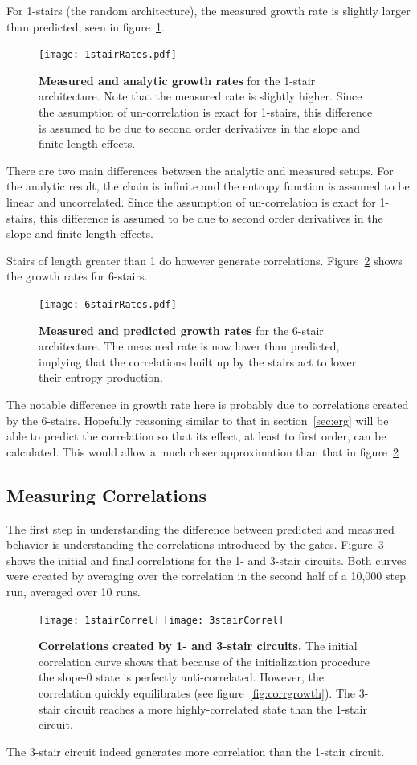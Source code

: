 \documentclass[11pt]{article}
\begin{document}
For 1-stairs (the random architecture), the measured growth rate is slightly larger than predicted, seen in figure~\ref{fig:1stairRates}.
\begin{figure}
	\centering
	\texttt{[image: 1stairRates.pdf]}
	\caption{\textbf{Measured and analytic growth rates} for the 1-stair architecture. Note that the measured rate is slightly higher. Since the assumption of un-correlation is exact for 1-stairs, this difference is assumed to be due to second order derivatives in the slope and finite length effects.}
	\label{fig:1stairRates}
\end{figure}
There are two main differences between the analytic and measured setups. For the analytic result, the chain is infinite and the entropy function is assumed to be linear and uncorrelated. Since the assumption of un-correlation is exact for 1-stairs, this difference is assumed to be due to second order derivatives in the slope and finite length effects.

Stairs of length greater than 1 do however generate correlations. Figure~\ref{fig:6stairRates} shows the growth rates for 6-stairs. 
\begin{figure}
	\centering
	\texttt{[image: 6stairRates.pdf]}
	\caption{\textbf{Measured and predicted growth rates} for the 6-stair architecture. The measured rate is now lower than predicted, implying that the correlations built up by the stairs act to lower their entropy production.}
	\label{fig:6stairRates}
\end{figure}
The notable difference in growth rate here is probably due to correlations created by the 6-stairs. Hopefully reasoning similar to that in section~\ref{sec:erg} will be able to predict the correlation so that its effect, at least to first order, can be calculated. This would allow a much closer approximation than that in figure~\ref{fig:6stairRates}

\subsection{Measuring Correlations} \emph{} \label{sub:correlations}

The first step in understanding the difference between predicted and measured behavior is understanding the correlations introduced by the gates. Figure~\ref{fig:stairCorrel} shows the initial and final correlations for the 1- and 3-stair circuits. Both curves were created by averaging over the correlation in the second half of a 10,000 step run, averaged over 10 runs.
\begin{figure}
	\centering
	\texttt{[image: 1stairCorrel]}
	\texttt{[image: 3stairCorrel]}
	\caption{\textbf{Correlations created by 1- and 3-stair circuits.} The initial correlation curve shows that because of the initialization procedure the slope-0 state is perfectly anti-correlated. However, the correlation quickly equilibrates (see figure~\ref{fig:corrgrowth}). The 3-stair circuit reaches a more highly-correlated state than the 1-stair circuit.}
	\label{fig:stairCorrel}
\end{figure}
The 3-stair circuit indeed generates more correlation than the 1-stair circuit. 
\end{document}
